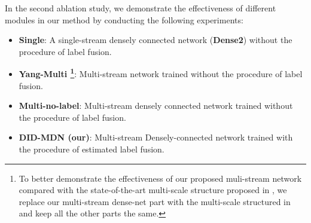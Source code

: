 \documentclass[10pt,twocolumn,letterpaper]{article}
\begin{document}
In the second ablation study, we demonstrate the effectiveness of different modules in our method by conducting the following experiments: 
\begin{itemize}[noitemsep]   
  \item \textbf{Single}: A single-stream densely connected network (\textbf{Dense2}) without the procedure of label fusion. 
  \item \textbf{Yang-Multi  \cite{derain_cvpr2017_multi}\footnote{To better demonstrate the effectiveness of our proposed muli-stream network compared with the state-of-the-art multi-scale structure proposed in \cite{derain_cvpr2017_multi}, we replace our multi-stream dense-net part with the multi-scale structured in \cite{derain_cvpr2017_multi} and keep all the other parts the same.}}: Multi-stream  network trained without the procedure of label fusion. 
  \item \textbf{Multi-no-label}: Multi-stream densely connected network trained without the procedure of label fusion. 
  \item \textbf{DID-MDN (our)}: Multi-stream Densely-connected network trained with the procedure of estimated label fusion.
\end{itemize}
\end{document}
